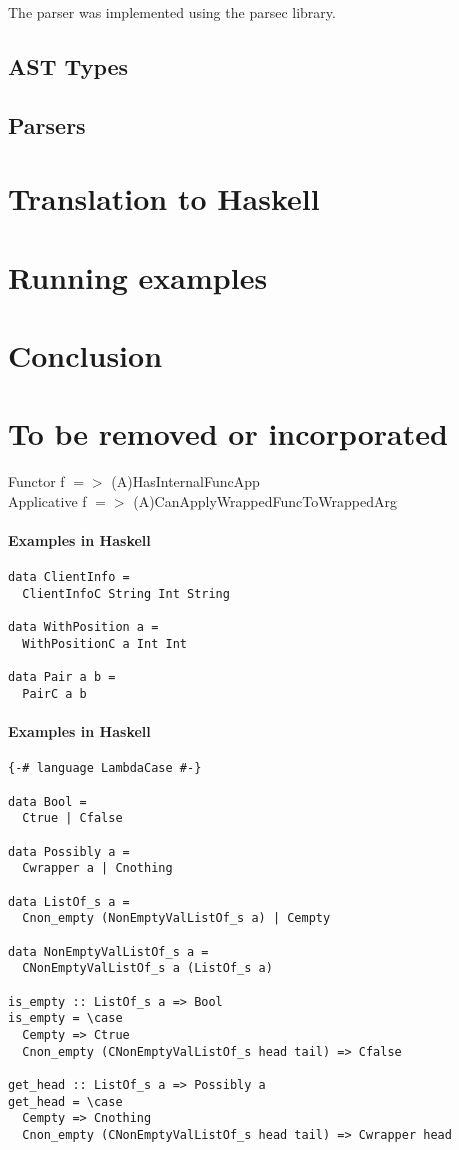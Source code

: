 \documentclass{article}
\def\H{Haskell}
\begin{document}
The parser was implemented using the parsec library.

\subsection{AST Types}

\subsection{Parsers}

\section{Translation to \H}
\section{Running examples}
\section{Conclusion}

\section{To be removed or incorporated}

Functor f $=>$ (A)HasInternalFuncApp\\
Applicative f $=>$ (A)CanApplyWrappedFuncToWrappedArg
\paragraph{Examples in \H}

\begin{verbatim}
data ClientInfo =
  ClientInfoC String Int String

data WithPosition a = 
  WithPositionC a Int Int

data Pair a b = 
  PairC a b
\end{verbatim}

\paragraph{Examples in \H}

\begin{verbatim}
{-# language LambdaCase #-}

data Bool =
  Ctrue | Cfalse

data Possibly a =
  Cwrapper a | Cnothing

data ListOf_s a =
  Cnon_empty (NonEmptyValListOf_s a) | Cempty

data NonEmptyValListOf_s a =
  CNonEmptyValListOf_s a (ListOf_s a)

is_empty :: ListOf_s a => Bool
is_empty = \case
  Cempty => Ctrue
  Cnon_empty (CNonEmptyValListOf_s head tail) => Cfalse

get_head :: ListOf_s a => Possibly a
get_head = \case
  Cempty => Cnothing
  Cnon_empty (CNonEmptyValListOf_s head tail) => Cwrapper head
\end{verbatim}
\end{document}
